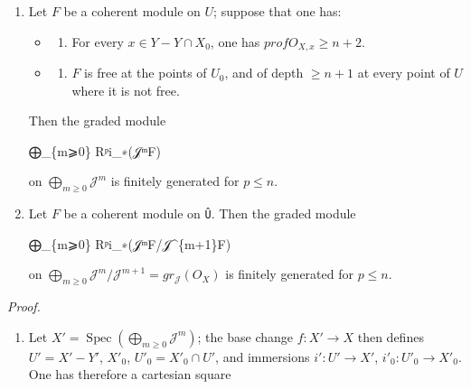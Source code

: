 \documentclass[
]{article}
\newenvironment{Shaded}{}{}
\newcommand{\NormalTok}[1]{#1}
\providecommand{\tightlist}{%
  \setlength{\itemsep}{0pt}\setlength{\parskip}{0pt}}
\begin{document}
\begin{enumerate}
\def\labelenumi{\arabic{enumi}.}
\item
  Let \(F\) be a coherent module on \(U\); suppose that one has:

  \begin{itemize}
  \tightlist
  \item
    \begin{enumerate}
    \def\labelenumii{\alph{enumii})}
    \setcounter{enumii}{2}
    \tightlist
    \item
      For every \(x \in Y - Y \cap X_{0}\), one has
      \(prof O_{X,x} \geqslant n + 2\).
    \end{enumerate}
  \item
    \begin{enumerate}
    \def\labelenumii{\alph{enumii})}
    \setcounter{enumii}{3}
    \tightlist
    \item
      \(F\) is free at the points of \(U_{0}\), and of depth
      \(\geqslant n + 1\) at every point of \(U\) where it is not free.
    \end{enumerate}
  \end{itemize}

  Then the graded module

\begin{Shaded}
\begin{Highlighting}[]
\NormalTok{⨁\_\{m⩾0\} Rᵖi\_∗(𝒥ᵐF)}
\end{Highlighting}
\end{Shaded}

  on \(\bigoplus_{m\geqslant 0} \mathcal{J}^{m}\) is finitely generated
  for \(p \leqslant n\).
\item
  Let \(F\) be a coherent module on \texttt{Û}. Then the graded module

\begin{Shaded}
\begin{Highlighting}[]
\NormalTok{⨁\_\{m⩾0\} Rᵖi\_∗(𝒥ᵐF/𝒥\^{}\{m+1\}F)}
\end{Highlighting}
\end{Shaded}

  on
  \(\bigoplus_{m\geqslant 0} \mathcal{J}^{m}/\mathcal{J}^{m+1} = gr_{\mathcal{J}}(O_{X})\)
  is finitely generated for \(p \leqslant n\).
\end{enumerate}

\emph{Proof.}

\begin{enumerate}
\def\labelenumi{(\arabic{enumi})}
\tightlist
\item
  Let
  \(X' = \operatorname{Spec}(\bigoplus_{m\geqslant 0} \mathcal{J}^{m})\);
  the base change \(f: X' \to X\) then defines \(U' = X' - Y'\),
  \(X'_{0}\), \(U'_{0} = X'_{0} \cap U'\), and immersions
  \(i': U' \to X'\), \(i'_{0}: U'_{0} \to X'_{0}\). One has therefore a
  cartesian square
\end{enumerate}
\end{document}
